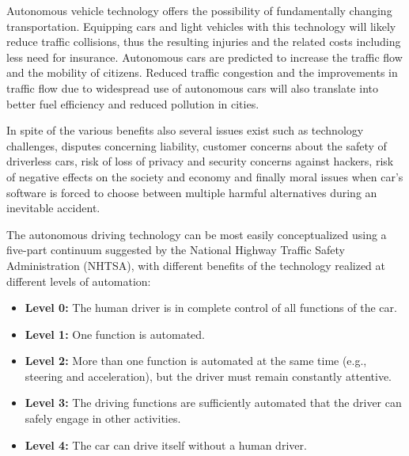 \documentclass[12pt,english]{article}
\begin{document}
Autonomous vehicle technology offers the possibility of fundamentally
changing transportation. Equipping cars and light vehicles
with this technology will likely reduce traffic collisions, thus the resulting injuries and the related costs including less need for insurance. Autonomous cars are predicted to increase the traffic flow and the mobility of citizens. Reduced traffic congestion and the improvements in traffic flow due to widespread use of autonomous cars will also translate into better fuel efficiency and reduced pollution in cities.

In spite of the various benefits also several issues exist such as technology challenges, disputes concerning liability, customer concerns about the safety of driverless cars, risk of loss of privacy and security concerns against hackers, risk of negative effects on the society and economy and finally moral issues when car's software is forced to choose between multiple harmful alternatives during an inevitable accident. 
 

The autonomous driving technology can be most easily conceptualized using a five-part
continuum suggested by the National Highway Traffic Safety Administration
(NHTSA), with different benefits of the technology realized
at different levels of automation:
\begin{itemize}
	\item \textbf{Level 0:}  The human driver is in complete control of all functions of the car.
	\item \textbf{Level 1:}  One function is automated.
	\item \textbf{Level 2:}  More than one function is automated at the same time (e.g., steering and acceleration), but the driver must remain constantly attentive.
	\item \textbf{Level 3:} The driving functions are sufficiently automated that the driver can safely engage in other activities.
	\item \textbf{Level 4:} The car can drive itself without a human driver.\cite{c}
\end{itemize}
\noindent
\end{document}
